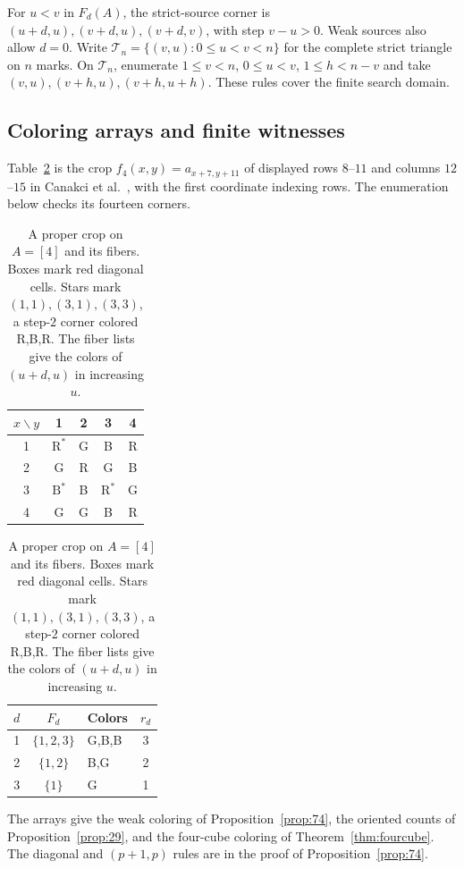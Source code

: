 \documentclass[11pt,a4paper]{article}
\theoremstyle{definition}
\newcommand{\Ttri}{\mathcal T}
\numberwithin{equation}{section}
\begin{document}
For $u<v$ in $F_d(A)$, the strict-source corner is
$(u+d,u),(v+d,u),(v+d,v)$, with step $v-u>0$.
Weak sources also allow $d=0$. Write $\Ttri_n=\{(v,u):0\le u<v<n\}$ for the complete strict triangle on $n$ marks. On $\Ttri_n$, enumerate
$1\le v<n$, $0\le u<v$, $1\le h<n-v$ and take
$(v,u),(v+h,u),(v+h,u+h)$. These rules cover the finite search domain.

\subsection{Coloring arrays and finite witnesses}\label{app:energy-cube-arrays}
Table~\ref{tab:w1} is the crop $f_4(x,y)=a_{x+7,y+11}$ of
displayed rows $8$--$11$ and columns $12$--$15$ in
Canakci et al.~\cite[Figure~1]{CCFGMS23}, with the first coordinate
indexing rows. The enumeration below checks its fourteen corners.

\begin{table}[!htbp]
	\centering
	\caption{A proper crop on $A=[4]$ and its fibers. Boxes mark red diagonal cells. Stars mark $(1,1),(3,1),(3,3)$, a step-$2$ corner colored R,B,R. The fiber lists give the colors of $(u+d,u)$ in increasing $u$.}
	\label{tab:w1}
	\begin{tabular}{@{}ccccc@{}}
		\toprule $x\backslash y$&1&2&3&4\\\midrule
		1&$\boxed{\mathrm R}^{*}$&G&B&R\\
		2&G&$\boxed{\mathrm R}$&G&B\\
		3&$\mathrm B^{*}$&B&$\boxed{\mathrm R}^{*}$&G\\
		4&G&G&B&$\boxed{\mathrm R}$\\\bottomrule
	\end{tabular}\qquad
	\begin{tabular}{@{}cclc@{}}
		\toprule $d$&$F_d$&Colors&$r_d$\\\midrule
		1&$\{1,2,3\}$&G,B,B&3\\
		2&$\{1,2\}$&B,G&2\\
		3&$\{1\}$&G&1\\\bottomrule
	\end{tabular}
\end{table}

The arrays give the weak coloring of
Proposition~\ref{prop:74}, the oriented counts of Proposition~\ref{prop:29},
and the four-cube coloring of Theorem~\ref{thm:fourcube}.
The diagonal and $(p+1,p)$ rules are in the proof
of Proposition~\ref{prop:74}.
\end{document}
